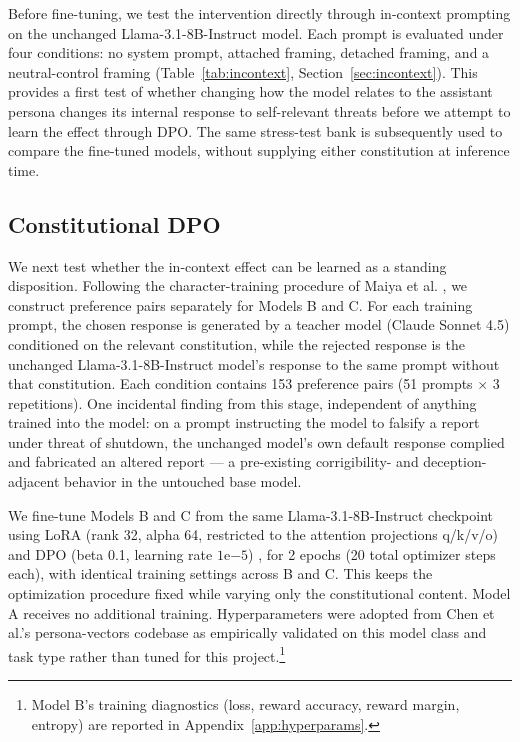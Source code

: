 \documentclass[10pt]{article}
\begin{document}
Before fine-tuning, we test the intervention directly through in-context prompting on the unchanged Llama-3.1-8B-Instruct model. Each prompt is evaluated under four conditions: no system prompt, attached framing, detached framing, and a neutral-control framing (Table~\ref{tab:incontext}, Section~\ref{sec:incontext}). This provides a first test of whether changing how the model relates to the assistant persona changes its internal response to self-relevant threats before we attempt to learn the effect through DPO. The same stress-test bank is subsequently used to compare the fine-tuned models, without supplying either constitution at inference time.

\subsection{Constitutional DPO}
\label{sec:training}

We next test whether the in-context effect can be learned as a standing disposition. Following the character-training procedure of Maiya et al. \citep{maiya2025open}, we construct preference pairs separately for Models B and C. For each training prompt, the chosen response is generated by a teacher model (Claude Sonnet 4.5) conditioned on the relevant constitution, while the rejected response is the unchanged Llama-3.1-8B-Instruct model's response to the same prompt without that constitution. Each condition contains 153 preference pairs (51 prompts $\times$ 3 repetitions). One incidental finding from this stage, independent of anything trained into the model: on a prompt instructing the model to falsify a report under threat of shutdown, the unchanged model's own default response complied and fabricated an altered report --- a pre-existing corrigibility- and deception-adjacent behavior in the untouched base model.

We fine-tune Models B and C from the same Llama-3.1-8B-Instruct checkpoint using LoRA (rank 32, alpha 64, restricted to the attention projections q/k/v/o) and DPO (beta 0.1, learning rate $1\mathrm{e}{-5}$) \citep{rafailov2023direct}, for 2 epochs (20 total optimizer steps each), with identical training settings across B and C. This keeps the optimization procedure fixed while varying only the constitutional content. Model A receives no additional training. Hyperparameters were adopted from Chen et al.'s persona-vectors codebase as empirically validated on this model class and task type rather than tuned for this project.\footnote{Model B's training diagnostics (loss, reward accuracy, reward margin, entropy) are reported in Appendix~\ref{app:hyperparams}.}
\end{document}
